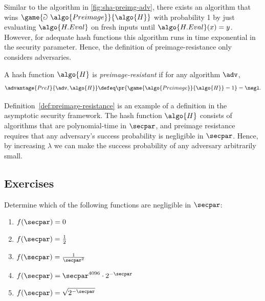 Similar to the algorithm in \autoref{fig:sha-preimg-adv}, there exists an algorithm that wins $\game{\Game~\algo{Preimage}}{\algo{H}}$ with probability 1 by just evaluating $\algo{H.Eval}$ on fresh inputs until $\algo{H.Eval}(x) = y$.
However, for adequate hash functions this algorithm runs in time exponential in the security parameter.
Hence, the definition of preimage-resistance only considers \ppt adversaries.

\begin{definition}\label{def:preimage-resistance}
  A hash function $\algo{H}$ is \emph{preimage-resistant} if for any \ppt algorithm $\adv$,
 \[
  \advantage{PreI}{\adv, \algo{H}} \defeq \pr{\game{\algo{Preimage}}{\algo{H}} = 1} = \negl.
 \]
\end{definition}


\begin{remark}
  Definition~\ref{def:preimage-resistance} is an example of a definition in the asymptotic security framework.
  The hash function $\algo{H}$ consists of algorithms that are polynomial-time in $\secpar$, and preimage resistance requires that any \ppt adversary's success probability is negligible in $\secpar$.
  Hence, by increasing $\lambda$ we can make the success probability of any \ppt adversary arbitrarily small.
\end{remark}


\subsection{Exercises}

\begin{exercise}\label{ex:negligible-functions}
  Determine which of the following functions are negligible in $\secpar$:
  \begin{enumerate}
    \item $f(\secpar) = 0$
    \item $f(\secpar) = \frac{1}{2}$
    \item $f(\secpar) = \frac{1}{\secpar^2}$
    \item $f(\secpar) = \secpar^{4096} \cdot 2^{-\secpar}$
    \item $f(\secpar) = \sqrt{2^{-\secpar}}$
  \end{enumerate}
\end{exercise}


